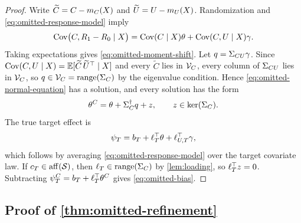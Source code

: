\begin{proof}
Write $\widetilde C=C-m_C(X)$ and
$\widetilde U=U-m_U(X)$. Randomization and
\eqref{eq:omitted-response-model} imply
\[
  {\rm Cov}\bigl(C,R_{1}-R_{0}\mid X\bigr)
  ={\rm Cov}(C\mid X)\theta+{\rm Cov}(C,U\mid X)\gamma.
\]
Taking expectations gives \eqref{eq:omitted-moment-shift}. Let
$q=\Sigma_{CU}\gamma$. Since ${\rm Cov}(C,U\mid X)=\mathbb{E}[\widetilde C\,\widetilde U^\top\mid X]$
and every $\widetilde C$ lies in $\mathcal V_C$, every column of $\Sigma_{CU}$ lies in
$\mathcal V_C$, so $q\in\mathcal V_C=\operatorname{range}(\Sigma_C)$ by the eigenvalue condition.
Hence \eqref{eq:omitted-normal-equation} has a solution, and every
solution has the form
\[
  \theta^C=\theta+\Sigma_C^\dagger q+z,
  \qquad z\in\operatorname{ker}(\Sigma_C).
\] The true target effect is
\[
  \psi_T=b_T+\ell_T^\top\theta+\ell_{U,T}^\top\gamma,
\]
which follows by averaging \eqref{eq:omitted-response-model} over the target
covariate law. If $c_T\in\operatorname{aff}(\mathcal S)$, then
$\ell_T\in\operatorname{range}(\Sigma_C)$ by \cref{lem:loading}, so
$\ell_T^\top z=0$. Subtracting
$\psi_T^C=b_T+\ell_T^\top\theta^C$ gives
\eqref{eq:omitted-bias}.
\end{proof}

\subsection{Proof of \texorpdfstring{\cref{thm:omitted-refinement}}{Theorem on omitted-moderator refinement}}
\label{app:proof-omitted-refinement}

